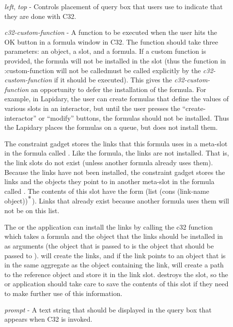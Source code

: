 \begin{description}
\item[] {\it left}, {\it top} - Controls placement of query box that users
use to indicate that they are done with C32.



{\it c32-custom-function} - A function to be executed when the user hits
the OK button in a formula window in C32. The function should
take three parameters: an object, a slot, and a formula.
If a custom function is provided, the formula will not be
installed in the slot (thus the function in :custom-function will
not be called\dashit must be called explicitly by the {\it c32-custom-function}
if it should be executed). This
gives the {\it c32-custom-function} an opportunity to defer the
installation of the formula. For example, in Lapidary,
the user can create formulas that define the values of
various slots in an interactor, but until the user presses
the ``create-interactor'' or ``modify'' buttons, the
formulas should not be installed. Thus the Lapidary 
places the formulas on a queue, but does not install them.

The constraint gadget stores the links that this formula uses
in a meta-slot in the formula called .
Like the formula,
the links are not installed. That is, the link slots do
not exist (unless another formula already uses them). Because
the links have not been installed, the constraint gadget stores
the links and the objects they point to in another meta-slot
in the formula called . The contents of
this slot have the form (list (cons (link-name object))$^{\hbox{*}}$).
Links that
already exist because another formula uses them will not be
on this list.

The  or the application can
install the links by calling
the c32 function  which takes a formula and
the object that the links should be installed in as arguments
(the object that is passed to  is the object
that should be passed to ). 
will create the links, and if the link points to an object
that is in the same aggregate as the object containing the
link,  will create a path to the reference
object and store it in the link
slot. 
destroys the  slot, so the  or
application should take care to save the contents of this slot
if they need to make further use of this information.



\item[] {\it prompt} - A text string that should be displayed in the query box
that appears when C32 is invoked.

\end{description}

